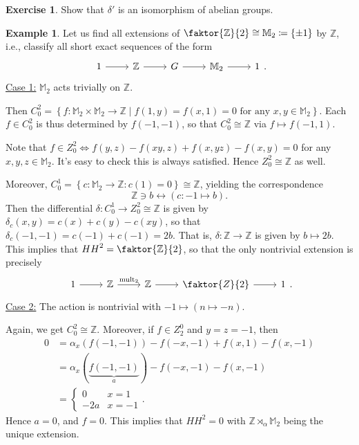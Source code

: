 \documentclass[10pt,letterpaper,cm]{nupset}
\theoremstyle{definition}
\newtheorem{exmp}[definition]{Example}
\theoremstyle{theorem}
\newtheorem{exercise}[definition]{Exercise}
\theoremstyle{remark}
\newcommand{\M}{\mathbb M}
\newcommand{\Z}{\mathbb Z}
\newcommand{\1}{\mathbf{1}}
\newcommand{\0}{\vec 0}
\DeclareMathOperator{\mult}{mult}
\begin{document}
\begin{exercise}
Show that $\delta '$ is an isomorphism of abelian groups.
\end{exercise}

\begin{exmp}
Let us find all extensions of $\faktor{\Z}{2}\cong \M_2 \coloneqq  \{\pm1\}$ by $\Z$, i.e., classify all short exact sequences of the form
\[
\begin{tikzcd}
1 \arrow[r] & \Z \arrow[r] & G \arrow[r] & \M_2 \arrow[r] & 1
\end{tikzcd}
.\]
\underline{Case 1:} $\M_2$ acts trivially on $\Z$. 

Then $C^2_0 = \left\{f : \M_2 \times \M_2 \to \Z \mid f(1, y) = f(x, 1) = 0 \text{ for any } x,y \in \M_2 \right\}$. Each $f \in C^2_0$ is thus determined by $f(-1, -1)$, so that $C^2_0 \cong \Z$ via $f\mapsto f(-1, 1)$.

\medskip

 Note that $f\in Z^2_0 \iff f(y, z)-f(xy, z)+f(x, yz)-f(x, y) =0$ for any $x, y, z\in \M_2$. It's easy to check this is always satisfied. Hence $Z^2_0 \cong \Z$ as well. 

\medskip

 Moreover, $C^1_0 = \left\{c : \M_2 \to \Z : c(1) =0\right\} \cong \Z$, yielding the correspondence $$\Z \ni b \longleftrightarrow \left(c: {-1} \mapsto b\right).$$ Then the differential $\delta : C^1_0 \to Z^2_0\cong \Z$ is given by $\delta_c(x, y) = c(x)+c(y) -c(xy)$, so that $\delta_c({-1}, {-1}) = c({-1}) + c({-1}) = 2b$. That is, $\delta : \Z \to \Z$ is given by $b \mapsto 2b$. This implies that ${HH}^2 = \faktor{\Z}{2}$, so that the only nontrivial extension is precisely
\[
\begin{tikzcd}
1 \arrow[r] & \Z \arrow[r, "\mult_2"] & \Z \arrow[r] & \faktor{Z}{2} \arrow[r] & 1
\end{tikzcd}.
\]
\underline{Case 2:} The action is nontrivial with ${-1} \mapsto \left(n \mapsto {-n}\right)$. 

 Again, we get $C^2_0 \cong \Z$. Moreover, if $f\in Z_2^0$ and $y= z = {-1}$, then 
\begin{align*}
0 & = \alpha_x(f({-1}, {-1})) - f({-x}, {-1})+ f(x, 1)- f(x, {-1})
\\ & = \alpha_x(\underbrace{f({-1}, {-1})}_a) - f({-x}, {-1})- f(x, {-1}) 
\\ & =
\begin{cases}
0 & x =1 \\
{-2a} & x = {-1}
\end{cases}.
\end{align*}
Hence $a = 0$, and $f = 0$. This implies that ${HH}^2 = 0$ with $\Z \rtimes_{\alpha} \M_2$ being the unique extension. 
\end{exmp}
\end{document}
